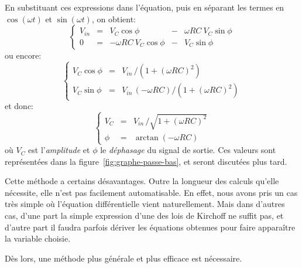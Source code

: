 En substituant ces expressions dans l'équation,
puis en séparant les termes en $\cos(\omega t)$ et $\sin(\omega t)$,
on obtient:
\begin{equation}
    \left\{
        \begin{array}{ccrcr}
            V_{in} &=& V_C\cos\phi &-& \omega RC\ V_C\sin\phi \\
            0 &=& -\omega RC\ V_C\cos\phi &-& V_C\sin\phi
        \end{array}
    \right.
\end{equation}
ou encore:
\begin{equation}
    \left\{
        \begin{array}{ccl}
            V_C\cos\phi &=& V_{in}\,/(1+(\omega RC)^2) \\
            V_C\sin\phi &=& V_{in}\,(-\omega RC) / (1+(\omega RC)^2)
        \end{array}
    \right.
\end{equation}
et donc:
\begin{equation}
    \left\{
        \begin{array}{ccl}
            V_C &=& V_{in}\,/ \sqrt{1+(\omega RC)^2} \\
            \phi &=& \arctan(-\omega RC)
        \end{array}
    \right.
\end{equation}
où $V_C$ est l'\emph{amplitude} et $\phi$ le \emph{déphasage}
du signal de sortie.
Ces valeurs sont représentées dans la figure~\ref{fig:graphe-passe-bas},
et seront discutées plus tard.

Cette méthode a certains désavantages.
Outre la longueur des calculs qu'elle nécessite,
elle n'est pas facilement automatisable.
En effet, nous avons pris un cas très simple où l'équation différentielle
vient naturellement.
Mais dans d'autres cas,
d'une part la simple expression d'une
des lois de Kirchoff ne suffit pas,
et d'autre part il faudra parfois dériver les équations
obtenues pour faire apparaître la variable choisie.

Dès lors, une méthode plus générale et plus efficace est nécessaire.
